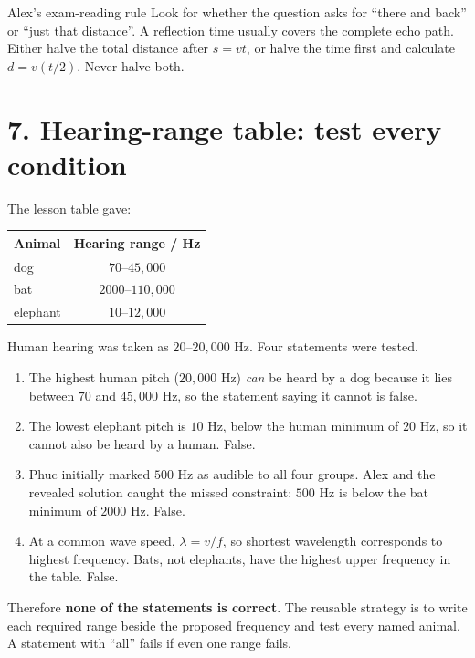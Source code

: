 \documentclass[11pt,a4paper]{article}
\begin{document}
\begin{center}
\end{center}

\begin{mistakebox}{Alex's exam-reading rule}
Look for whether the question asks for ``there and back'' or ``just that distance''. A reflection time usually covers the complete echo path. Either halve the total distance after $s=vt$, or halve the time first and calculate $d=v(t/2)$. Never halve both.
\end{mistakebox}

\section*{7. Hearing-range table: test every condition}
The lesson table gave:
\begin{center}
\begin{tabular}{lc}\toprule Animal & Hearing range / Hz\\\midrule dog & $70$--$45{,}000$\\ bat & $2000$--$110{,}000$\\ elephant & $10$--$12{,}000$\\\bottomrule\end{tabular}
\end{center}
Human hearing was taken as $20$--$20{,}000$ Hz. Four statements were tested.
\begin{enumerate}
\item The highest human pitch ($20{,}000$ Hz) \emph{can} be heard by a dog because it lies between $70$ and $45{,}000$ Hz, so the statement saying it cannot is false.
\item The lowest elephant pitch is $10$ Hz, below the human minimum of $20$ Hz, so it cannot also be heard by a human. False.
\item Phuc initially marked $500$ Hz as audible to all four groups. Alex and the revealed solution caught the missed constraint: $500$ Hz is below the bat minimum of $2000$ Hz. False.
\item At a common wave speed, $\lambda=v/f$, so shortest wavelength corresponds to highest frequency. Bats, not elephants, have the highest upper frequency in the table. False.
\end{enumerate}
Therefore \textbf{none of the statements is correct}. The reusable strategy is to write each required range beside the proposed frequency and test every named animal. A statement with ``all'' fails if even one range fails.
\end{document}
